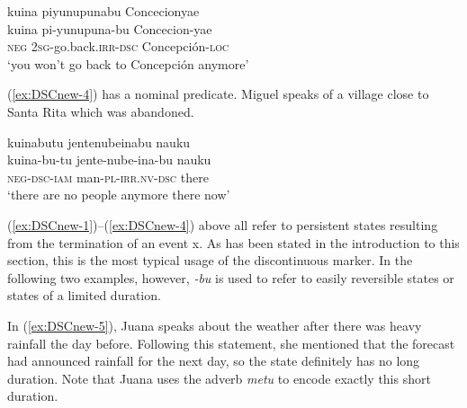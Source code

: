 \ea\label{ex:dsc-3}
\begingl 
\glpreamble kuina piyunupunabu Concecionyae\\
\gla kuina pi-yunupuna-bu Concecion-yae\\ 
\glb \textsc{neg} 2\textsc{sg}-go.back.\textsc{irr}-\textsc{dsc} Concepción-\textsc{loc}\\ 
\glft ‘you won’t go back to Concepción anymore’
\trailingcitation{[jxx-p120430l-1.134]}
\xe

%

(\ref{ex:DSCnew-4}) has a nominal predicate. Miguel speaks of a village close to Santa Rita which was abandoned.

\ea\label{ex:DSCnew-4}
\begingl
\glpreamble kuinabutu jentenubeinabu nauku\\
\gla kuina-bu-tu jente-nube-ina-bu nauku\\
\glb \textsc{neg}-\textsc{dsc}-\textsc{iam} man-\textsc{pl}-\textsc{irr.nv}-\textsc{dsc} there\\
\glft ‘there are no people anymore there now’
\endgl
\trailingcitation{[mty-p110906l.134]}
\xe

(\ref{ex:DSCnew-1})–(\ref{ex:DSCnew-4}) above all refer to persistent states resulting from the termination of an event x. As has been stated in the introduction to this section, this is the most typical usage of the discontinuous marker. In the following two examples, however, \textit{-bu} is used to refer to easily reversible states or states of a limited duration.

In (\ref{ex:DSCnew-5}), Juana speaks about the weather after there was heavy rainfall the day before. Following this statement, she mentioned that the forecast had announced rainfall for the next day, so the state definitely has no long duration. Note that Juana uses the adverb \textit{metu} to encode exactly this short duration.

